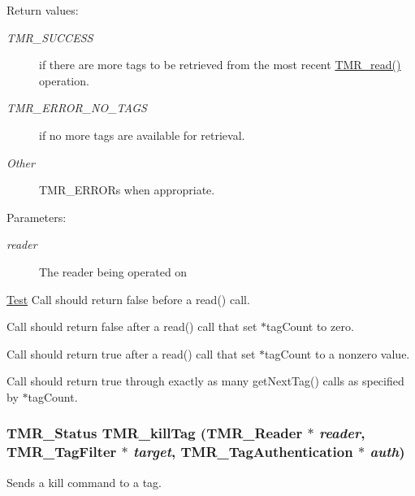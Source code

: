 \begin{Desc}
\item[Return values:]
\begin{description}
\item[{\em TMR\_\-SUCCESS}]if there are more tags to be retrieved from the most recent \hyperlink{group__reader_gb477ff41498adaa35ca5cae932ecfc70}{TMR\_\-read()} operation. \item[{\em TMR\_\-ERROR\_\-NO\_\-TAGS}]if no more tags are available for retrieval. \item[{\em Other}]TMR\_\-ERRORs when appropriate.\end{description}
\end{Desc}
\begin{Desc}
\item[Parameters:]
\begin{description}
\item[{\em reader}]The reader being operated on\end{description}
\end{Desc}
\begin{Desc}
\item[\hyperlink{test__test000006}{Test}]Call should return false before a read() call. 

Call should return false after a read() call that set $\ast$tagCount to zero. 

Call should return true after a read() call that set $\ast$tagCount to a nonzero value. 

Call should return true through exactly as many getNextTag() calls as specified by $\ast$tagCount. \end{Desc}
\hypertarget{group__reader_gf27dfca0b93aec3cd8e24b5c60f7e9bb}{
\subsubsection[{TMR\_\-killTag}]{\setlength{\rightskip}{0pt plus 5cm}TMR\_\-Status TMR\_\-killTag ({\bf TMR\_\-Reader} $\ast$ {\em reader}, \/  {\bf TMR\_\-TagFilter} $\ast$ {\em target}, \/  {\bf TMR\_\-TagAuthentication} $\ast$ {\em auth})}}
\label{group__reader_gf27dfca0b93aec3cd8e24b5c60f7e9bb}


Sends a kill command to a tag.

